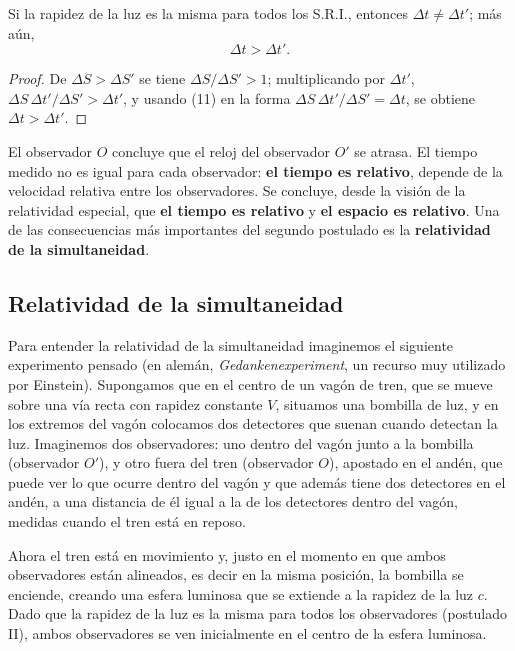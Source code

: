 \begin{proposicionc}
Si la rapidez de la luz es la misma para todos los S.R.I., entonces
$\Delta t\neq\Delta t'$; más aún,
\[
\Delta t>\Delta t' . \tag{12}
\]
\end{proposicionc}

\begin{proof}
De $\Delta S>\Delta S'$ se tiene $\Delta S/\Delta S'>1$; multiplicando
por $\Delta t'$, $\Delta S\,\Delta t'/\Delta S'>\Delta t'$, y usando (11)
en la forma $\Delta S\,\Delta t'/\Delta S'=\Delta t$, se obtiene
$\Delta t>\Delta t'$. \qedhere
\end{proof}

El observador $O$ concluye que el reloj del observador $O'$ se atrasa.
El tiempo medido no es igual para cada observador: \textbf{el tiempo es
relativo}, depende de la velocidad relativa entre los observadores. Se
concluye, desde la visión de la relatividad especial, que
\textbf{el tiempo es relativo} y \textbf{el espacio es relativo}. Una de
las consecuencias más importantes del segundo postulado es la
\textbf{relatividad de la simultaneidad}.

\subsection{Relatividad de la simultaneidad}

Para entender la relatividad de la simultaneidad imaginemos el
siguiente experimento pensado (en alemán, \emph{Gedankenexperiment}, un
recurso muy utilizado por Einstein). Supongamos que en el centro de un
vagón de tren, que se mueve sobre una vía recta con rapidez constante
$V$, situamos una bombilla de luz, y en los extremos del vagón
colocamos dos detectores que suenan cuando detectan la luz. Imaginemos
dos observadores: uno dentro del vagón junto a la bombilla (observador
$O'$), y otro fuera del tren (observador $O$), apostado en el andén, que
puede ver lo que ocurre dentro del vagón y que además tiene dos
detectores en el andén, a una distancia de él igual a la de los
detectores dentro del vagón, medidas cuando el tren está en reposo.

Ahora el tren está en movimiento y, justo en el momento en que ambos
observadores están alineados, es decir en la misma posición, la bombilla
se enciende, creando una esfera luminosa que se extiende a la rapidez de
la luz $c$. Dado que la rapidez de la luz es la misma para todos los
observadores (postulado II), ambos observadores se ven inicialmente en
el centro de la esfera luminosa.

